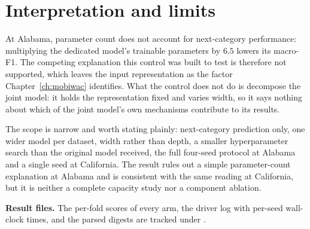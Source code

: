 \section{Interpretation and limits}
\label{sec:apx-parameter-result}

At Alabama, parameter count does not account for next-category performance: multiplying the
dedicated model's trainable parameters by $6.5$ lowers its macro-F1. The competing explanation this
control was built to test is therefore not supported, which leaves the input representation as the
factor Chapter~\ref{ch:mobiwac} identifies. What the control does not do is decompose the joint
model: it holds the representation fixed and varies width, so it says nothing about which of the
joint model's own mechanisms contribute to its results.

The scope is narrow and worth stating plainly: next-category prediction only, one wider model per
dataset, width rather than depth, a smaller hyperparameter search than the original model received,
the full four-seed protocol at Alabama and a single seed at California. The result rules out a
simple parameter-count explanation at Alabama and is consistent with the same reading at
California, but it is neither a complete capacity study nor a component ablation.

\noindent\textbf{Result files.} The per-fold scores of every arm, the driver log with per-seed
wall-clock times, and the parsed digests are tracked under
.
